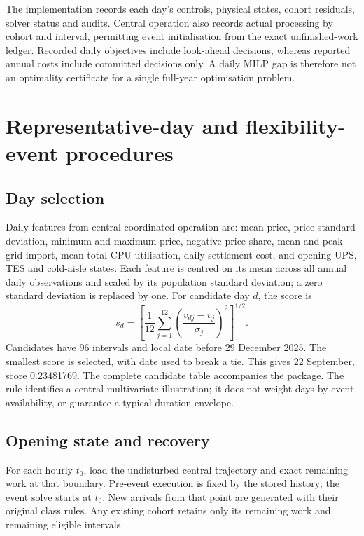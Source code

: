 The implementation records each day's controls, physical states, cohort residuals, solver status and audits. Central operation also records actual processing by cohort and interval, permitting event initialisation from the exact unfinished-work ledger. Recorded daily objectives include look-ahead decisions, whereas reported annual costs include committed decisions only. A daily MILP gap is therefore not an optimality certificate for a single full-year optimisation problem.

\section{Representative-day and flexibility-event procedures}
\subsection{Day selection}
Daily features from central coordinated operation are: mean price, price standard deviation, minimum and maximum price, negative-price share, mean and peak grid import, mean total CPU utilisation, daily settlement cost, and opening UPS, TES and cold-aisle states. Each feature is centred on its mean across all annual daily observations and scaled by its population standard deviation; a zero standard deviation is replaced by one. For candidate day $d$, the score is
\begin{equation}
s_d=\left[\frac{1}{12}\sum_{j=1}^{12}
\left(\frac{v_{dj}-\bar v_j}{\sigma_j}\right)^2\right]^{1/2}.
\end{equation}
Candidates have 96 intervals and local date before 29 December 2025. The smallest score is selected, with date used to break a tie. This gives 22 September, score 0.23481769. The complete candidate table accompanies the package. The rule identifies a central multivariate illustration; it does not weight days by event availability, or guarantee a typical duration envelope.

\subsection{Opening state and recovery}
For each hourly $t_0$, load the undisturbed central trajectory and exact remaining work at that boundary. Pre-event execution is fixed by the stored history; the event solve starts at $t_0$. New arrivals from that point are generated with their original class rules. Any existing cohort retains only its remaining work and remaining eligible intervals.

